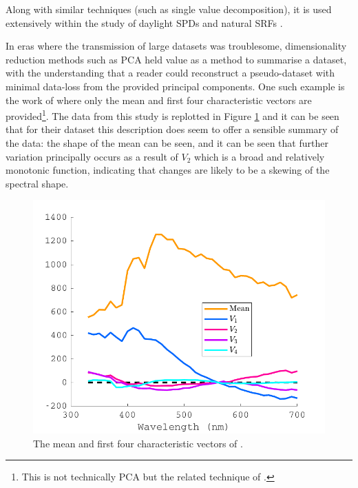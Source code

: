 Along with similar techniques (such as single value decomposition), it is used extensively within the study of daylight \glspl{SPD} \citep{hernandez-andres_color_2001,ojeda_influence_2012,pant_estimating_2009,bui_group_2004,judd_spectral_1964,maloney_computational_1984,spitschan_variation_2016} and natural \glspl{SRF} \citep{maloney_computational_1984,dzmura_color_1992,maloney_evaluation_1986,maloney_color_1986,cohen_dependency_1964,ferrero_principal_2011,zhang_reconstructing_2008,kwon_surface_2007,agahian_reconstruction_2008,harifi_recovery_2008,parkkinen_characteristic_1989,vrhel_color_1992,fairman_principal_2004,ayala_use_2006,eem_reconstruction_1994-2,connah_multispectral_2006,shi_using_2002,morovic_metamer-set-based_2006}. 


In eras where the transmission of large datasets was troublesome, dimensionality reduction methods such as \gls{PCA} held value as a method to summarise a dataset, with the understanding that a reader could reconstruct a pseudo-dataset with minimal data-loss from the provided principal components. One such example is the work of \citet{judd_spectral_1964} where only the mean and first four characteristic vectors are provided\footnote{This is not technically \gls{PCA} but the related technique of \citet{morris_objective_1954}.}. The data from this study is replotted in Figure \ref{fig:Judd} and it can be seen that for their dataset this description does seem to offer a sensible summary of the data: the shape of the mean can be seen, and it can be seen that further variation principally occurs as a result of $V_{2}$ which is a broad and relatively monotonic function, indicating that changes are likely to be a skewing of the spectral shape.

\begin{figure}[htbp]
 \includegraphics[max width=\textwidth]{figs/LitRev/Judd.pdf}
 \caption{The mean and first four characteristic vectors of \citet{judd_spectral_1964}.}
 \label{fig:Judd}
\end{figure} 